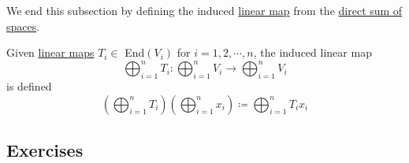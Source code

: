   We end this subsection by defining the induced \hyperref[def:linear_map]{linear map} from the \hyperref[def:direct-sum-of-spaces]{direct sum of spaces}. 

  \begin{definition}
    \label{def:induced-linear-map-on-a-direct-sum}
    Given \hyperref[def:linear_map]{linear maps} $T_i \in$ End$(V_i)$ for $i = 1, 2, \cdots, n$, the induced linear map
    \begin{equation}
      \bigoplus_{i =1}^n T_i: \bigoplus_{i=1}^n V_i \to \bigoplus_{i=1}^n V_i
    \end{equation}
    is defined
    \begin{equation}
      (\bigoplus_{i=1}^n T_i)(\bigoplus_{i=1}^n x_i) \coloneqq \bigoplus_{i=1}^n T_i x_i
    \end{equation}
  \end{definition}

\subsection{Exercises}
